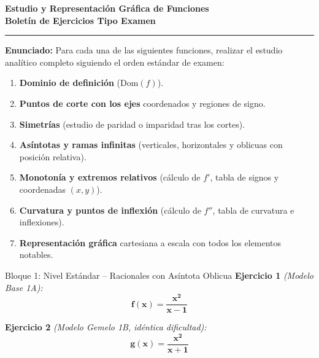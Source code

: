 \documentclass[10pt,a4paper]{article}
\begin{document}
\begin{center}
    {\LARGE \textbf{\color{wordblue} Estudio y Representación Gráfica de Funciones}}\\[3mm]
    {\large \textbf{Boletín de Ejercicios Tipo Examen}}
\end{center}

\vspace{3mm}
\hrule
\vspace{5mm}

\noindent \textbf{Enunciado:} Para cada una de las siguientes funciones, realizar el estudio analítico completo siguiendo el orden estándar de examen:
\begin{enumerate}\itemsep 1.5pt
    \item \textbf{Dominio de definición} ($\text{Dom}(f)$).
    \item \textbf{Puntos de corte con los ejes} coordenados y regiones de signo.
    \item \textbf{Simetrías} (estudio de paridad o imparidad tras los cortes).
    \item \textbf{Asíntotas y ramas infinitas} (verticales, horizontales y oblicuas con posición relativa).
    \item \textbf{Monotonía y extremos relativos} (cálculo de $f'$, tabla de signos y coordenadas $(x, y)$).
    \item \textbf{Curvatura y puntos de inflexión} (cálculo de $f''$, tabla de curvatura e inflexiones).
    \item \textbf{Representación gráfica} cartesiana a escala con todos los elementos notables.
\end{enumerate}

\vspace{5mm}

\begin{ejerciciobox}{Bloque 1: Nivel Estándar -- Racionales con Asíntota Oblicua}
\vspace{2mm}
\noindent \textbf{Ejercicio 1} \textit{(Modelo Base 1A):}
$$\mathbf{f(x) = \frac{x^2}{x - 1}}$$

\vspace{2mm}
\noindent \textbf{Ejercicio 2} \textit{(Modelo Gemelo 1B, idéntica dificultad):}
$$\mathbf{g(x) = \frac{x^2}{x + 1}}$$
\end{ejerciciobox}
\end{document}
